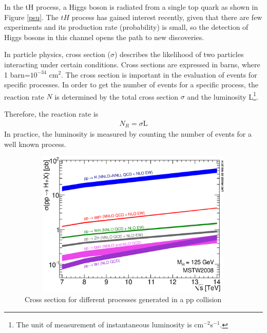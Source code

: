 
In the tH process, a Higgs boson is radiated from a single top quark as shown in Figure \ref{psu}. The $tH$ process has gained interest recently\cite{th1}, given that there are few experiments and its production rate (probability) is small, so the detection of Higgs bosons in this channel opens the path to new discoveries.

In particle physics, cross section ($\sigma$) describes the likelihood of two particles interacting under certain conditions.
 Cross sections are expressed in barns, where 1 barn=$10^{-34}$ cm$^{2}$.
The cross section is important in the evaluation of events for specific processes. In order to get the number of events for a specific process, the reaction rate $N$ is determined by the total cross section $\sigma$ and the luminosity L\footnote{The unit of measurement of instantaneous luminosity is cm$^{-2}$s$^{-1}$. }.

Therefore, the reaction rate is 
\begin{align} \label{nr}
N_R=\sigma \text{L}
\end{align}
In practice, the luminosity is measured by counting the number of events for a well known process.
\begin{figure}[ht]
	\centering%
	\includegraphics[width=12cm,height=7cm]{Chapter1/7-14xsec.eps}
	\caption[Cross section for different processes generated in a pp collision]{
		Cross section for different processes generated in a pp collision  \cite{dcrosse}}
	\label{csp}
\end{figure}

